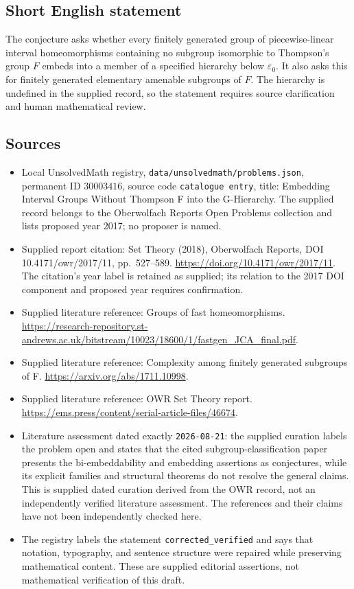 \documentclass[11pt]{article}
\begin{document}
\subsection{Short English statement}
The conjecture asks whether every finitely generated group of piecewise-linear interval homeomorphisms containing no subgroup isomorphic to Thompson's group \(F\) embeds into a member of a specified hierarchy below \(\varepsilon_0\). It also asks this for finitely generated elementary amenable subgroups of \(F\). The hierarchy is undefined in the supplied record, so the statement requires source clarification and human mathematical review.
\subsection{Sources}
\begin{itemize}
\item Local UnsolvedMath registry, \texttt{data/unsolvedmath/problems.json}, permanent ID \(30003416\), source code \texttt{catalogue entry}, title: Embedding Interval Groups Without Thompson F into the G-Hierarchy. The supplied record belongs to the Oberwolfach Reports Open Problems collection and lists proposed year 2017; no proposer is named.
\item Supplied report citation: Set Theory (2018), Oberwolfach Reports, DOI 10.4171/owr/2017/11, pp.\ 527--589. \url{https://doi.org/10.4171/owr/2017/11}. The citation's year label is retained as supplied; its relation to the 2017 DOI component and proposed year requires confirmation.
\item Supplied literature reference: Groups of fast homeomorphisms. \url{https://research-repository.st-andrews.ac.uk/bitstream/10023/18600/1/fastgen_JCA_final.pdf}.
\item Supplied literature reference: Complexity among finitely generated subgroups of F. \url{https://arxiv.org/abs/1711.10998}.
\item Supplied literature reference: OWR Set Theory report. \url{https://ems.press/content/serial-article-files/46674}.
\item Literature assessment dated exactly \texttt{2026-08-21}: the supplied curation labels the problem open and states that the cited subgroup-classification paper presents the bi-embeddability and embedding assertions as conjectures, while its explicit families and structural theorems do not resolve the general claims. This is supplied dated curation derived from the OWR record, not an independently verified literature assessment. The references and their claims have not been independently checked here.
\item The registry labels the statement \texttt{corrected\_verified} and says that notation, typography, and sentence structure were repaired while preserving mathematical content. These are supplied editorial assertions, not mathematical verification of this draft.
\end{itemize}
\end{document}
